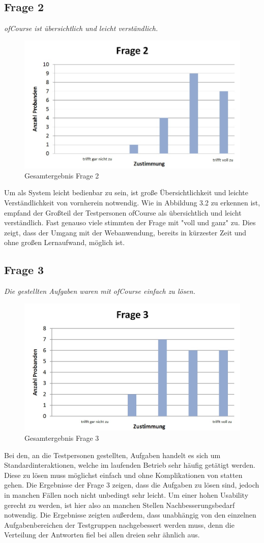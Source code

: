 \subsection{Frage 2}
\begin{center}
	{\it ofCourse ist übersichtlich und leicht verständlich.}
\end{center}
\begin{figure}[h]
\centering
\includegraphics[width=0.7\linewidth]{img/Frage2}
\caption{Gesamtergebnis Frage 2}
\label{fig:Frage2}
\end{figure}
Um als System leicht bedienbar zu sein, ist große Übersichtlichkeit und leichte Verständlichkeit von vornherein notwendig. Wie in Abbildung 3.2 zu erkennen ist, empfand der Großteil der Testpersonen ofCourse als übersichtlich und leicht verständlich. Fast genauso viele stimmten der Frage mit "voll und ganz" zu. Dies zeigt, dass der Umgang mit der Webanwendung, bereits in kürzester Zeit und ohne großen Lernaufwand, möglich ist.
\newpage
\subsection{Frage 3}
\begin{center}
	{\it Die gestellten Aufgaben waren mit ofCourse einfach zu lösen.}
\end{center}
\begin{figure}[h]
\centering
\includegraphics[width=0.7\linewidth]{img/Frage3}
\caption{Gesamtergebnis Frage 3}
\label{fig:Frage3}
\end{figure}
Bei den, an die Testpersonen gestellten, Aufgaben handelt es sich um Standardinteraktionen, welche im laufenden Betrieb sehr häufig getätigt werden. Diese zu lösen muss möglichst einfach und ohne Komplikationen von statten gehen. Die Ergebnisse der Frage 3 zeigen, dass die Aufgaben zu lösen sind, jedoch in manchen Fällen noch nicht unbedingt sehr leicht. Um einer hohen Usability gerecht zu werden, ist hier also an manchen Stellen Nachbesserungsbedarf notwendig. Die Ergebnisse zeigten außerdem, dass unabhängig von den einzelnen Aufgabenbereichen der Testgruppen nachgebessert werden muss, denn die Verteilung der Antworten fiel bei allen dreien sehr ähnlich aus.
\newpage
